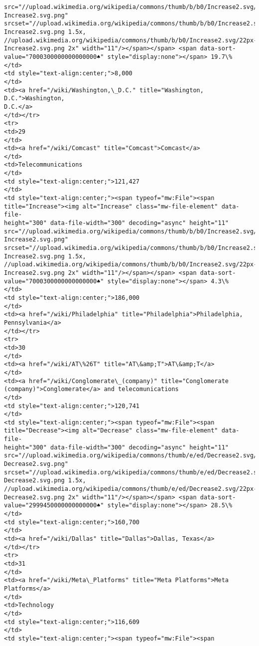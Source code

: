 \documentclass[11pt]{article}
\begin{document}
\begin{Verbatim}[commandchars=\\\{\}]
src="//upload.wikimedia.org/wikipedia/commons/thumb/b/b0/Increase2.svg/11px-
Increase2.svg.png"
srcset="//upload.wikimedia.org/wikipedia/commons/thumb/b/b0/Increase2.svg/17px-
Increase2.svg.png 1.5x,
//upload.wikimedia.org/wikipedia/commons/thumb/b/b0/Increase2.svg/22px-
Increase2.svg.png 2x" width="11"/></span></span> <span data-sort-
value="7000300000000000000♠" style="display:none"></span> 19.7\%
</td>
<td style="text-align:center;">8,000
</td>
<td><a href="/wiki/Washington,\_D.C." title="Washington, D.C.">Washington,
D.C.</a>
</td></tr>
<tr>
<td>29
</td>
<td><a href="/wiki/Comcast" title="Comcast">Comcast</a>
</td>
<td>Telecommunications
</td>
<td style="text-align:center;">121,427
</td>
<td style="text-align:center;"><span typeof="mw:File"><span
title="Increase"><img alt="Increase" class="mw-file-element" data-file-
height="300" data-file-width="300" decoding="async" height="11"
src="//upload.wikimedia.org/wikipedia/commons/thumb/b/b0/Increase2.svg/11px-
Increase2.svg.png"
srcset="//upload.wikimedia.org/wikipedia/commons/thumb/b/b0/Increase2.svg/17px-
Increase2.svg.png 1.5x,
//upload.wikimedia.org/wikipedia/commons/thumb/b/b0/Increase2.svg/22px-
Increase2.svg.png 2x" width="11"/></span></span> <span data-sort-
value="7000300000000000000♠" style="display:none"></span> 4.3\%
</td>
<td style="text-align:center;">186,000
</td>
<td><a href="/wiki/Philadelphia" title="Philadelphia">Philadelphia,
Pennsylvania</a>
</td></tr>
<tr>
<td>30
</td>
<td><a href="/wiki/AT\%26T" title="AT\&amp;T">AT\&amp;T</a>
</td>
<td><a href="/wiki/Conglomerate\_(company)" title="Conglomerate
(company)">Conglomerate</a> and telecomunications
</td>
<td style="text-align:center;">120,741
</td>
<td style="text-align:center;"><span typeof="mw:File"><span
title="Decrease"><img alt="Decrease" class="mw-file-element" data-file-
height="300" data-file-width="300" decoding="async" height="11"
src="//upload.wikimedia.org/wikipedia/commons/thumb/e/ed/Decrease2.svg/11px-
Decrease2.svg.png"
srcset="//upload.wikimedia.org/wikipedia/commons/thumb/e/ed/Decrease2.svg/17px-
Decrease2.svg.png 1.5x,
//upload.wikimedia.org/wikipedia/commons/thumb/e/ed/Decrease2.svg/22px-
Decrease2.svg.png 2x" width="11"/></span></span> <span data-sort-
value="2999450000000000000♠" style="display:none"></span> 28.5\%
</td>
<td style="text-align:center;">160,700
</td>
<td><a href="/wiki/Dallas" title="Dallas">Dallas, Texas</a>
</td></tr>
<tr>
<td>31
</td>
<td><a href="/wiki/Meta\_Platforms" title="Meta Platforms">Meta Platforms</a>
</td>
<td>Technology
</td>
<td style="text-align:center;">116,609
</td>
<td style="text-align:center;"><span typeof="mw:File"><span

\end{Verbatim}
\end{document}
